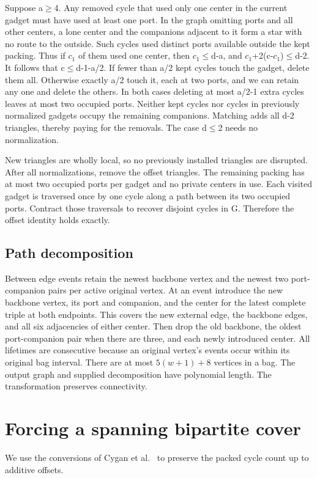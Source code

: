 \documentclass[11pt]{article}
\begin{document}
Suppose a\(\ge\)4. Any removed cycle that used only one center in the current gadget must have used at least one port. In the graph omitting ports and all other centers, a lone center and the companions adjacent to it form a star with no route to the outside. Such cycles used distinct ports available outside the kept packing. Thus if $c_1$ of them used one center, then $c_1$\(\le\)d-a, and $c_1$+2(c-$c_1$)\(\le\)d-2. It follows that c\(\le\)d-1-a/2. If fewer than a/2 kept cycles touch the gadget, delete them all. Otherwise exactly a/2 touch it, each at two ports, and we can retain any one and delete the others. In both cases deleting at most a/2-1 extra cycles leaves at most two occupied ports. Neither kept cycles nor cycles in previously normalized gadgets occupy the remaining companions. Matching adds all d-2 triangles, thereby paying for the removals. The case d\(\le\)2 needs no normalization.

New triangles are wholly local, so no previously installed triangles are disrupted. After all normalizations, remove the offset triangles. The remaining packing has at most two occupied ports per gadget and no private centers in use. Each visited gadget is traversed once by one cycle along a path between its two occupied ports. Contract those traversals to recover disjoint cycles in G. Therefore the offset identity holds exactly.

\subsection{Path decomposition}

Between edge events retain the newest backbone vertex and the newest two port-companion pairs per active original vertex. At an event introduce the new backbone vertex, its port and companion, and the center for the latest complete triple at both endpoints. This covers the new external edge, the backbone edges, and all six adjacencies of either center. Then drop the old backbone, the oldest port-companion pair when there are three, and each newly introduced center. All lifetimes are consecutive because an original vertex's events occur within its original bag interval. There are at most $5(w+1)+8$ vertices in a bag. The output graph and supplied decomposition have polynomial length. The transformation preserves connectivity.


\section{Forcing a spanning bipartite cover}
We use the conversions of Cygan et al.~\cite[Lemmas C.21 and C.22]{ccpre}
to preserve the packed cycle count up to additive offsets.
\end{document}
